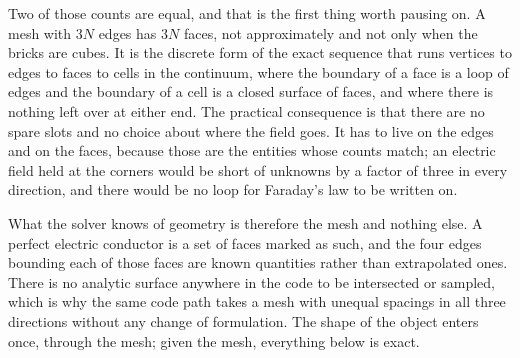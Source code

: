 Two of those counts are equal, and that is the first thing worth pausing on. A mesh with $3N$ edges has $3N$
faces, not approximately and not only when the bricks are cubes. It is the discrete form of the exact sequence
that runs vertices to edges to faces to cells in the continuum, where the boundary of a face is a loop of edges
and the boundary of a cell is a closed surface of faces, and where there is nothing left over at either end.
The practical consequence is that there are no spare slots and no choice about where the field goes. It has to
live on the edges and on the faces, because those are the entities whose counts match; an electric field held
at the corners would be short of unknowns by a factor of three in every direction, and there would be no loop
for Faraday's law to be written on.

What the solver knows of geometry is therefore the mesh and nothing else. A perfect electric conductor is a set
of faces marked as such, and the four edges bounding each of those faces are known quantities rather than
extrapolated ones. There is no analytic surface anywhere in the code to be intersected or sampled, which is why
the same code path takes a mesh with unequal spacings in all three directions without any change of
formulation. The shape of the object enters once, through the mesh; given the mesh, everything below is exact.

